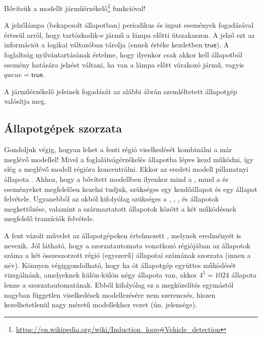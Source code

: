 Bővítsük a modellt járműérzékelő\footnote{\url{https://en.wikipedia.org/wiki/Induction\_loop\#Vehicle\_detection}} funkcióval!

\begin{tipp}
	A jelzőlámpa (bekapcsolt állapotban) periodikus  és  input események fogadásával értesül arról, hogy tartózkodik-e jármű a lámpa előtti útszakaszon. A jelző ezt az információt a  logikai változóban tárolja (ennek értéke kezdetben $\mathsf{true}$). A foglaltság nyilvántartásának értelme, hogy ilyenkor csak akkor kell  állapotból  esemény hatására jelzést váltani, ha van a lámpa előtt várakozó jármű, vagyis $\mathit{queue} = \mathsf{true}$.
\end{tipp}

A járműérzékelő jeleinek fogadását az alábbi ábrán szemléltetett állapotgép valósítja meg.


\subsection{Állapotgépek szorzata}

Gondoljuk végig, hogyan lehet a fenti  régió viselkedését kombinálni a már meglévő modellel! Mivel a foglalátságérzékelés  állapotba lépve kezd működni, így elég a meglévő modell  régióra koncentrálni. Ekkor az eredeti modell pillanatnyi állapota . Ahhoz, hogy a bővített modellben ilyenkor mind a , mind a  és  eseményeket megfelelően kezelni tudjuk, szükséges egy  kezdőállapot és egy  állapot felvétele. Ugyanebből az okból kifolyólag szükséges a , , ,  és  állapotok megkettőzése, valamint a származtatott állapotok között a két működésnek megfelelő tranzíciók felvétele.

A fent vázolt művelet az állapotgépeken értelmezett , melynek eredményét  is nevezik. Jól látható, hogy a szorzatautomata vonatkozó régiójában az állapotok száma a két összeszorzott régió (egyszerű) állapotai számának szorzata (innen a név). Könnyen végiggondolható, hogy ha öt állapotgép együttes működését vizsgálnánk, amelyeknek külön-külön négy állapota van, akkor $4^5=1024$ állapota lenne a szorzatautomatának. Ebből kifolyólag ez a megközelítés egymástól nagyban független viselkedések modellezésére nem szerencsés, hiszen kezelhetetlenül nagy méretű modellekhez vezet (ún.  jelensége).

